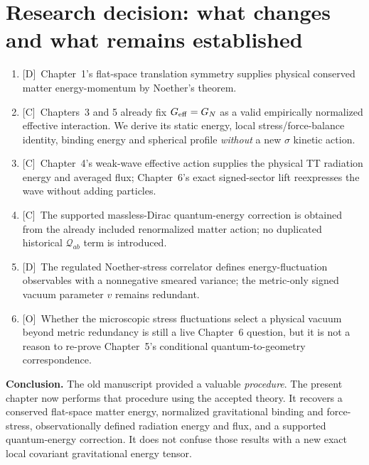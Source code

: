 \documentclass[11pt,a4paper]{article}
\theoremstyle{definition}\newtheorem{definition}[theorem]{Definition}
\theoremstyle{remark}\newtheorem{remark}[theorem]{Remark}
\newcommand{\Dtag}{\textsf{[D]}}
\newcommand{\Ctag}{\textsf{[C]}}
\newcommand{\Otag}{\textsf{[O]}}
\begin{document}
\section{Research decision: what changes and what remains established}
\label{sec:v13-decision}
\begin{enumerate}
\item \Dtag\ Chapter~1's flat-space translation symmetry supplies
physical conserved matter energy-momentum by Noether's theorem.
\item \Ctag\ Chapters~3 and 5 already fix $G_{\rm eff}=G_N$ as a
valid empirically normalized effective interaction.  We derive its
static energy, local stress/force-balance identity, binding energy and
spherical profile \emph{without} a new $\sigma$ kinetic action.
\item \Ctag\ Chapter~4's weak-wave effective action supplies the
physical TT radiation energy and averaged flux; Chapter~6's exact
signed-sector lift reexpresses the wave without adding particles.
\item \Ctag\ The supported massless-Dirac quantum-energy correction
is obtained from the already included renormalized matter action;
no duplicated historical $\mathcal Q_{ab}$ term is introduced.
\item \Dtag\ The regulated Noether-stress correlator defines
energy-fluctuation observables with a nonnegative smeared variance;
the metric-only signed vacuum parameter $v$ remains redundant.
\item \Otag\ Whether the microscopic stress fluctuations select a
physical vacuum beyond metric redundancy is still a live Chapter~6
question, but it is not a reason to re-prove Chapter~5's
conditional quantum-to-geometry correspondence.
\end{enumerate}
\textbf{Conclusion.} The old manuscript provided a valuable
\emph{procedure}.  The present chapter now performs that procedure
using the accepted theory.  It recovers a conserved flat-space
matter energy, normalized gravitational binding and force-stress,
observationally defined radiation energy and flux, and a supported
quantum-energy correction.  It does not confuse those results with a
new exact local covariant gravitational energy tensor.
\end{document}
